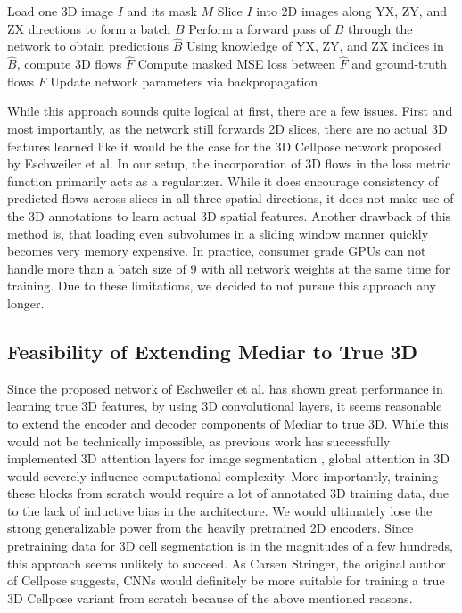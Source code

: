 \begin{algorithm}[H]
\caption{Training with masked 3D flow loss}
\label{algo:3Dflowtraining}
\begin{algorithmic}[1]
    \STATE Load one 3D image $I$ and its mask $M$
    \STATE Slice $I$ into 2D images along YX, ZY, and ZX directions to form a batch $B$
    \STATE Perform a forward pass of $B$ through the network to obtain predictions $\hat{B}$
    \STATE Using knowledge of YX, ZY, and ZX indices in $\hat{B}$, compute 3D flows $\hat{F}$
    \STATE Compute masked MSE loss between $\hat{F}$ and ground-truth flows $F$
    \STATE Update network parameters via backpropagation
\ENDFOR
\end{algorithmic}
\end{algorithm}

While this approach sounds quite logical at first, there are a few issues. First and most importantly, as the network still forwards 2D slices, there are no actual 3D features learned like it would be the case for the 3D Cellpose network proposed by Eschweiler et al. In our setup, the incorporation of 3D flows in the loss metric function primarily acts as a regularizer. While it does encourage consistency of predicted flows across slices in all three spatial directions, it does not make use of the 3D annotations to learn actual 3D spatial features. Another drawback of this method is, that loading even subvolumes in a sliding window manner quickly becomes very memory expensive. In practice, consumer grade GPUs can not handle more than a batch size of 9 with all network weights at the same time for training. Due to these limitations, we decided to not pursue this approach any longer.  

\subsection{Feasibility of Extending Mediar to True 3D}

Since the proposed network of Eschweiler et al. has shown great performance in learning true 3D features, by using 3D convolutional layers, it seems reasonable to extend the encoder and decoder components of Mediar to true 3D. While this would not be technically impossible, as previous work has successfully implemented 3D attention layers for image segmentation \cite{wald2025primusenforcingattentionusage}, global attention in 3D would severely influence computational complexity. More importantly, training these blocks from scratch would require a lot of annotated 3D training data, due to the lack of inductive bias in the architecture. We would ultimately lose the strong generalizable power from the heavily pretrained 2D encoders. Since pretraining data for 3D cell segmentation is in the magnitudes of a few hundreds, this approach seems unlikely to succeed. As Carsen Stringer, the original author of Cellpose suggests, CNNs would definitely be more suitable for training a true 3D Cellpose variant from scratch because of the above mentioned reasons.

